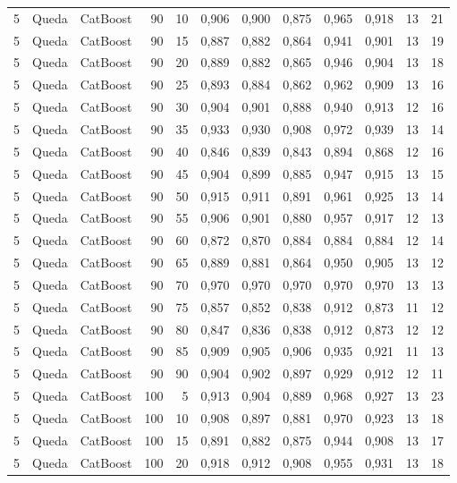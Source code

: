 \begin{longtable}{@{}rllrrrrrrrrr@{}}
5 & Queda & CatBoost & 90 & 10 & 0,906 & 0,900 & 0,875 & 0,965 & 0,918 & 13 & 21 \\
5 & Queda & CatBoost & 90 & 15 & 0,887 & 0,882 & 0,864 & 0,941 & 0,901 & 13 & 19 \\
5 & Queda & CatBoost & 90 & 20 & 0,889 & 0,882 & 0,865 & 0,946 & 0,904 & 13 & 18 \\
5 & Queda & CatBoost & 90 & 25 & 0,893 & 0,884 & 0,862 & 0,962 & 0,909 & 13 & 16 \\
5 & Queda & CatBoost & 90 & 30 & 0,904 & 0,901 & 0,888 & 0,940 & 0,913 & 12 & 16 \\
5 & Queda & CatBoost & 90 & 35 & 0,933 & 0,930 & 0,908 & 0,972 & 0,939 & 13 & 14 \\
5 & Queda & CatBoost & 90 & 40 & 0,846 & 0,839 & 0,843 & 0,894 & 0,868 & 12 & 16 \\
5 & Queda & CatBoost & 90 & 45 & 0,904 & 0,899 & 0,885 & 0,947 & 0,915 & 13 & 15 \\
5 & Queda & CatBoost & 90 & 50 & 0,915 & 0,911 & 0,891 & 0,961 & 0,925 & 13 & 14 \\
5 & Queda & CatBoost & 90 & 55 & 0,906 & 0,901 & 0,880 & 0,957 & 0,917 & 12 & 13 \\
5 & Queda & CatBoost & 90 & 60 & 0,872 & 0,870 & 0,884 & 0,884 & 0,884 & 12 & 14 \\
5 & Queda & CatBoost & 90 & 65 & 0,889 & 0,881 & 0,864 & 0,950 & 0,905 & 13 & 12 \\
5 & Queda & CatBoost & 90 & 70 & 0,970 & 0,970 & 0,970 & 0,970 & 0,970 & 13 & 13 \\
5 & Queda & CatBoost & 90 & 75 & 0,857 & 0,852 & 0,838 & 0,912 & 0,873 & 11 & 12 \\
5 & Queda & CatBoost & 90 & 80 & 0,847 & 0,836 & 0,838 & 0,912 & 0,873 & 12 & 12 \\
5 & Queda & CatBoost & 90 & 85 & 0,909 & 0,905 & 0,906 & 0,935 & 0,921 & 11 & 13 \\
5 & Queda & CatBoost & 90 & 90 & 0,904 & 0,902 & 0,897 & 0,929 & 0,912 & 12 & 11 \\
5 & Queda & CatBoost & 100 & 5 & 0,913 & 0,904 & 0,889 & 0,968 & 0,927 & 13 & 23 \\
5 & Queda & CatBoost & 100 & 10 & 0,908 & 0,897 & 0,881 & 0,970 & 0,923 & 13 & 18 \\
5 & Queda & CatBoost & 100 & 15 & 0,891 & 0,882 & 0,875 & 0,944 & 0,908 & 13 & 17 \\
5 & Queda & CatBoost & 100 & 20 & 0,918 & 0,912 & 0,908 & 0,955 & 0,931 & 13 & 18 \\

\end{longtable}
